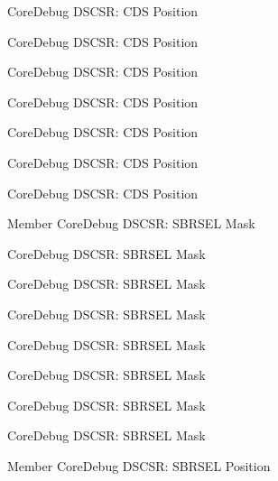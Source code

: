 \begin{DoxyRefList}
\label{deprecated__deprecated000093}%
%
Core\+Debug DSCSR\+: CDS Position 

\label{deprecated__deprecated000365}%
%
Core\+Debug DSCSR\+: CDS Position 

\label{deprecated__deprecated000441}%
%
Core\+Debug DSCSR\+: CDS Position 

\label{deprecated__deprecated000286}%
%
Core\+Debug DSCSR\+: CDS Position 

\label{deprecated__deprecated000646}%
%
Core\+Debug DSCSR\+: CDS Position 

\label{deprecated__deprecated000147}%
%
Core\+Debug DSCSR\+: CDS Position 

\label{deprecated__deprecated000544}%
%
Core\+Debug DSCSR\+: CDS Position  
\item[Member \doxylink{group__CMSIS__SCB_gaaffe28a24f05446e55ba3d75bb6f4cd0}{Core\+Debug\+\_\+\+DSCSR\+\_\+\+SBRSEL\+\_\+\+Msk} ]\label{deprecated__deprecated000368}%
%
Core\+Debug DSCSR\+: SBRSEL Mask 

\label{deprecated__deprecated000444}%
%
Core\+Debug DSCSR\+: SBRSEL Mask 

\label{deprecated__deprecated000096}%
%
Core\+Debug DSCSR\+: SBRSEL Mask 

\label{deprecated__deprecated000150}%
%
Core\+Debug DSCSR\+: SBRSEL Mask 

\label{deprecated__deprecated000649}%
%
Core\+Debug DSCSR\+: SBRSEL Mask 

\label{deprecated__deprecated000547}%
%
Core\+Debug DSCSR\+: SBRSEL Mask 

\label{deprecated__deprecated000226}%
%
Core\+Debug DSCSR\+: SBRSEL Mask 

\label{deprecated__deprecated000289}%
%
Core\+Debug DSCSR\+: SBRSEL Mask  
\item[Member \doxylink{group__CMSIS__SCB_ga7450603163415ab4d4e4a7a767879eae}{Core\+Debug\+\_\+\+DSCSR\+\_\+\+SBRSEL\+\_\+\+Pos} ]\label{deprecated__deprecated000443}%
%
Core\+Debug DSCSR\+: SBRSEL Position 


\end{DoxyRefList}
